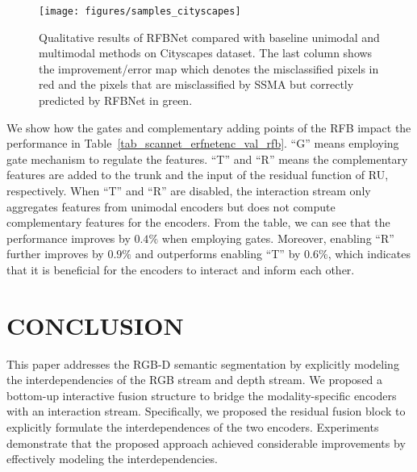 \documentclass[letterpaper, 10 pt, conference]{ieeeconf}
\begin{document}
	\begin{figure*}[!htbp]
		\centering
		\texttt{[image: figures/samples\_cityscapes]}
		\caption{Qualitative results of RFBNet compared with baseline unimodal and multimodal methods on Cityscapes dataset. The last column shows the improvement/error map which denotes the misclassified pixels in red and the pixels that are misclassified by SSMA but correctly predicted by RFBNet in green.}
		\label{fig_samples_cityscapes}
	\end{figure*}
	
	We show how the gates and complementary adding points of the RFB impact the performance in Table~\ref{tab_scannet_erfnetenc_val_rfb}. ``G'' means employing gate mechanism to regulate the features. ``T'' and ``R'' means the complementary features are added to the trunk and the input of the residual function of RU, respectively. When ``T'' and ``R'' are disabled, the interaction stream only aggregates features from unimodal encoders but does not compute complementary features for the encoders. From the table, we can see that the performance improves by $0.4\%$ when employing gates. Moreover, enabling ``R'' further improves by $0.9\%$ and outperforms enabling ``T'' by $0.6\%$, which indicates that it is beneficial for the encoders to interact and inform each other.

	\section{CONCLUSION}
	This paper addresses the RGB-D semantic segmentation by explicitly modeling the interdependencies of the RGB stream and depth stream. We proposed a bottom-up interactive fusion structure to bridge the modality-specific encoders with an interaction stream. Specifically, we proposed the residual fusion block to explicitly formulate the interdependences of the two encoders. Experiments demonstrate that the proposed approach achieved considerable improvements by effectively modeling the interdependencies.
	
	

	
	\newpage
	\clearpage
	
	

	
	
	
\end{document}
